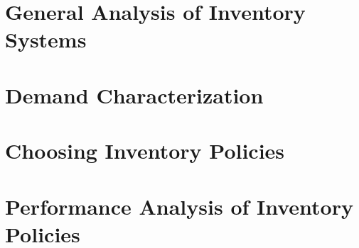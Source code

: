 \section{General Analysis of Inventory Systems}


\section{Demand Characterization}
\label{sec:character}


\section{Choosing Inventory Policies}







\section{Performance Analysis of Inventory Policies}



